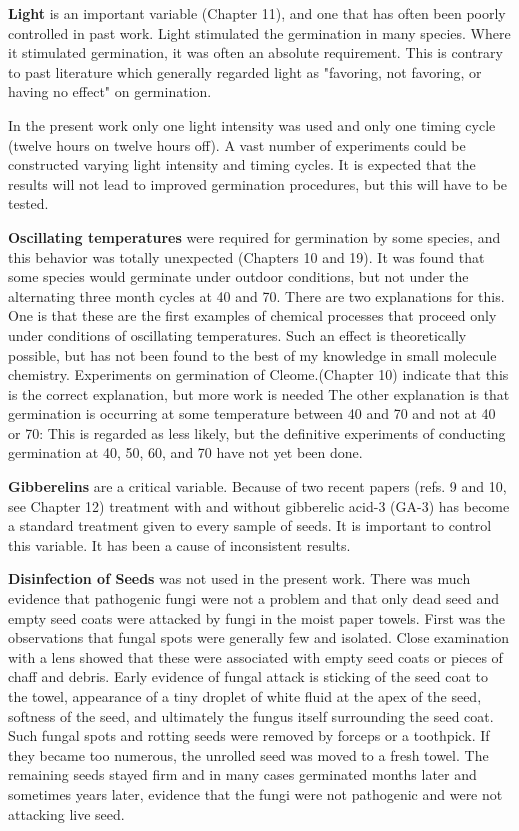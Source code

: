 \textbf{Light} is an important variable (Chapter 11), and one that has often been poorly
controlled in past work. Light stimulated the germination in many species. Where it
stimulated germination, it was often an absolute requirement. This is contrary to past
literature which generally regarded light as "favoring, not favoring, or having no effect"
on germination.

In the present work only one light intensity was used and only one timing cycle
(twelve hours on twelve hours off). A vast number of experiments could be constructed
varying light intensity and timing cycles. It is expected that the results will not lead to
improved germination procedures, but this will have to be tested.

\textbf{Oscillating temperatures} were required for germination by some species,
and this behavior was totally unexpected (Chapters 10 and 19). It was found that
some species would germinate under outdoor conditions, but not under the alternating
three month cycles at 40 and 70. There are two explanations for this. One is that
these are the first examples of chemical processes that proceed only under conditions
of oscillating temperatures. Such an effect is theoretically possible, but has not been
found to the best of my knowledge in small molecule chemistry. Experiments on
germination of Cleome.(Chapter 10) indicate that this is the correct explanation, but
more work is needed The other explanation is that germination is occurring at some
temperature between 40 and 70 and not at 40 or 70: This is regarded as less likely,
but the definitive experiments of conducting germination at 40, 50, 60, and 70 have not
yet been done.

\textbf{Gibberelins} are a critical variable. Because of two recent papers (refs. 9 and
10, see Chapter 12) treatment with and without gibberelic acid-3 (GA-3) has become a
standard treatment given to every sample of seeds. It is important to control this
variable. It has been a cause of inconsistent results.

\textbf{Disinfection of Seeds} was not used in the present work. There was much
evidence that pathogenic fungi were not a problem and that only dead seed and
empty seed coats were attacked by fungi in the moist paper towels. First was the
observations that fungal spots were generally few and isolated. Close examination
with a lens showed that these were associated with empty seed coats or pieces of
chaff and debris. Early evidence of fungal attack is sticking of the seed coat to the
towel, appearance of a tiny droplet of white fluid at the apex of the seed, softness of the
seed, and ultimately the fungus itself surrounding the seed coat. Such fungal spots
and rotting seeds were removed by forceps or a toothpick. If they became too
numerous, the unrolled seed was moved to a fresh towel. The remaining seeds
stayed firm and in many cases germinated months later and sometimes years later,
evidence that the fungi were not pathogenic and were not attacking live seed.

